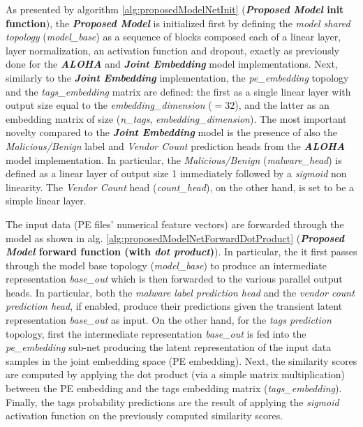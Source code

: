 \documentclass[pdfa%
,cucitura%
]{toptesi}
\begin{document}
As presented by algorithm \ref{alg:proposedModelNetInit} (\textbf{\textit{Proposed Model} init function}), the \textbf{\textit{Proposed Model}} is initialized first by defining the \textit{model shared topology} (\textit{model\_base}) as a sequence of blocks composed each of a linear layer, layer normalization, an activation function and dropout, exactly as previously done for the \textbf{\textit{ALOHA}} and \textbf{\textit{Joint Embedding}} model implementations. Next, similarly to the \textbf{\textit{Joint Embedding}} implementation, the \textit{pe\_embedding} topology and the \textit{tags\_embedding} matrix are defined: the first as a single linear layer with output size equal to the \textit{embedding\_dimension} ($=32$), and the latter as an embedding matrix of size (\textit{n\_tags}, \textit{embedding\_dimension}). The most important novelty compared to the \textbf{\textit{Joint Embedding}} model is the presence of also the \textit{Malicious/Benign} label and \textit{Vendor Count} prediction heads from the \textbf{\textit{ALOHA}} model implementation. In particular, the \textit{Malicious/Benign} (\textit{malware\_head}) is defined as a linear layer of output size 1 immediately followed by a \textit{sigmoid} non linearity. The \textit{Vendor Count} head (\textit{count\_head}), on the other hand, is set to be a simple linear layer.

The input data (PE files' numerical feature vectors) are forwarded through the model as shown in alg. \ref{alg:proposedModelNetForwardDotProduct} (\textbf{\textit{Proposed Model} forward function (with \textit{dot product})}). In particular, the it first passes through the model base topology (\textit{model\_base}) to produce an intermediate representation \textit{base\_out} which is then forwarded to the various parallel output heads. In particular, both the \textit{malware label prediction head} and the \textit{vendor count prediction head}, if enabled, produce their predictions given the transient latent representation \textit{base\_out} as input. On the other hand, for the \textit{tags prediction} topology, first the intermediate representation \textit{base\_out} is fed into the \textit{pe\_embedding} sub-net producing the latent representation of the input data samples in the joint embedding space (PE embedding). Next, the similarity scores are computed by applying the dot product (via a simple matrix multiplication) between the PE embedding and the tags embedding matrix (\textit{tags\_embedding}). Finally, the tags probability predictions are the result of applying the \textit{sigmoid} activation function on the previously computed similarity scores.
\end{document}
